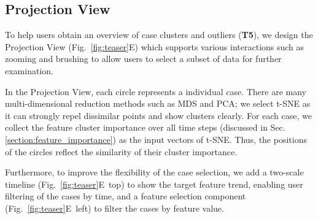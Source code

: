 \subsection{Projection View}
To help users obtain an overview of case clusters and outliers (\textbf{T5}), we design the Projection View (Fig.~\ref{fig:teaser}E) which supports various interactions such as zooming and brushing to allow users to select a subset of data for further examination.

In the Projection View, each circle represents a individual case. There are many multi-dimensional reduction methods such as MDS and PCA; we select t-SNE as it can strongly repel dissimilar points and show clusters clearly.
For each case, we collect the feature cluster importance over all time steps (discussed in Sec.\ref{section:feature_importance}) as the input vectors of t-SNE.
Thus, the positions of the circles reflect the similarity of their cluster importance.


Furthermore, to improve the flexibility of the case selection, we add a two-scale timeline (Fig.~\ref{fig:teaser}E~top) to show the target feature trend, enabling user filtering of the cases by time, and a feature selection component (Fig.~\ref{fig:teaser}E~left) to filter the cases by feature value.  

